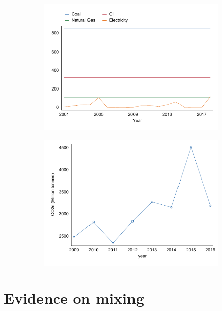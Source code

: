\documentclass[12pt,notitlepage]{article}
\begin{document}
\begin{figure}[!htpb]
\centering
\begin{subfigure}{.49\textwidth}
	\centering
	\includegraphics{../Output/Graphs/EmissionIntensity_bySource.pdf}
\end{subfigure}
\begin{subfigure}{.49\textwidth}
	\centering
	\includegraphics{../Output/Graphs/AggGHG_year_UnbalancedPanel.pdf}
\end{subfigure}
\end{figure}


\section{Evidence on mixing}
\end{document}
